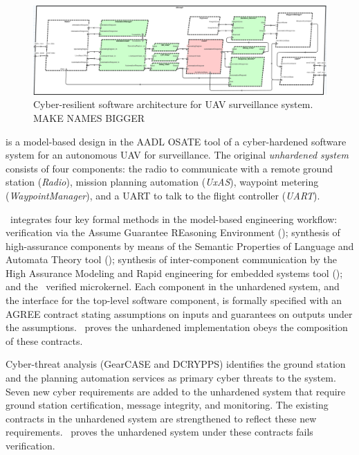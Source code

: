\begin{figure}
	\begin{center}
	  \includegraphics[width=\textwidth]{./figs/sw-hardened.png}
  \end{center}
	\caption{Cyber-resilient software architecture for UAV surveillance system. MAKE NAMES BIGGER} 
	\label{fig:sw-hardened} 
\end{figure}

 is a model-based design in the AADL OSATE tool of a cyber-hardened software
system for an autonomous UAV for surveillance.
The original \emph{unhardened system} consists of four components: the radio to communicate with a
remote ground
station (\emph{Radio}), mission planning automation (\emph{UxAS}), waypoint metering
(\emph{WaypointManager}), and a UART to talk to the flight controller (\emph{UART}).

\briefcase\ integrates four key formal methods in the model-based engineering workflow:
verification via the Assume Guarantee REasoning Environment (\agree);
synthesis of high-assurance components by means of the Semantic
Properties of Language and Automata Theory tool (\splat); synthesis
of inter-component communication by the High Assurance Modeling and
Rapid engineering for embedded systems tool (\hamr); and the \selFour\ verified microkernel.
Each component in the unhardened system, and the interface for the top-level software component, is
formally specified with an AGREE contract stating assumptions on inputs and guarantees on outputs
under the assumptions.
\agree\ proves the unhardened implementation obeys the composition of these contracts. 

Cyber-threat analysis (GearCASE and DCRYPPS) identifies the ground station and the planning
automation services as primary cyber threats to the system.
Seven new cyber requirements are added to the unhardened system that require ground station
certification, message integrity, and monitoring.
The existing contracts in the unhardened system are strengthened to reflect these new requirements.
\agree\ proves the unhardened system under these contracts fails verification. 

